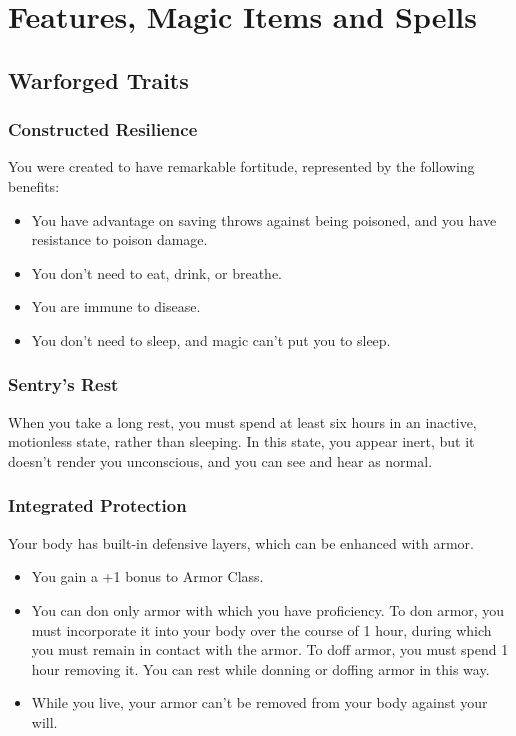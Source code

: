 \documentclass[letterpaper,openany,oneside,twocolumn]{book}
\begin{document}
\onecolumn


\rendercharactersheet

\renderbackgroundsheet

\renderspellsheet


\restoregeometry
\twocolumn

\chapter*{Features, Magic Items and Spells}

\section*{Warforged Traits}
\subsection*{Constructed Resilience}
You were created to have remarkable fortitude, represented by the following benefits:
\begin{itemize}
	\item You have advantage on saving throws against being poisoned, and you have resistance to poison damage.
	\item You don't need to eat, drink, or breathe.
	\item You are immune to disease.
	\item You don't need to sleep, and magic can't put you to sleep.
\end{itemize}
\subsection*{Sentry's Rest}
When you take a long rest, you must spend at least six hours in an inactive, motionless state, rather than sleeping. In this state, you appear inert, but it doesn't render you unconscious, and you can see and hear as normal.
\subsection*{Integrated Protection}
Your body has built-in defensive layers, which can be enhanced with armor.
\begin{itemize}
	\item You gain a +1 bonus to Armor Class.
	\item You can don only armor with which you have proficiency. To don armor, you must incorporate it into your body over the course of 1 hour, during which you must remain in contact with the armor. To doff armor, you must spend 1 hour removing it. You can rest while donning or doffing armor in this way.
	\item While you live, your armor can't be removed from your body against your will.
\end{itemize}
\end{document}

